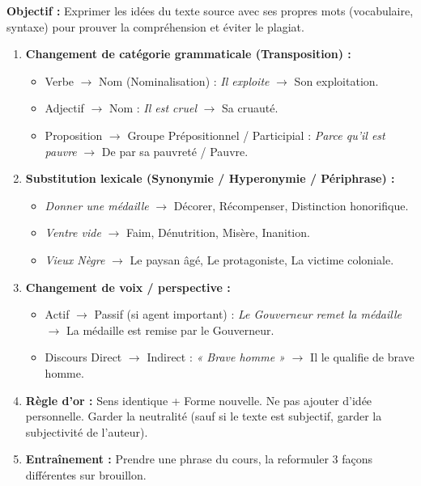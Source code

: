 \documentclass[11pt]{article}
\newcommand{\cle}[1]{{\popxbold\color{popdark}#1}}
\begin{document}
\begin{methode}
    \textbf{Objectif :} Exprimer les idées du texte source avec ses propres mots (vocabulaire, syntaxe) pour prouver la compréhension et éviter le plagiat.
    \begin{enumerate}
        \item \textbf{Changement de catégorie grammaticale (Transposition) :}
            \begin{itemize}
                \item Verbe $\rightarrow$ Nom (Nominalisation) : \textit{Il exploite} $\rightarrow$ \cle{Son exploitation}.
                \item Adjectif $\rightarrow$ Nom : \textit{Il est cruel} $\rightarrow$ \cle{Sa cruauté}.
                \item Proposition $\rightarrow$ Groupe Prépositionnel / Participial : \textit{Parce qu'il est pauvre} $\rightarrow$ \cle{De par sa pauvreté} / \cle{Pauvre}.
            \end{itemize}
        \item \textbf{Substitution lexicale (Synonymie / Hyperonymie / Périphrase) :}
            \begin{itemize}
                \item \textit{Donner une médaille} $\rightarrow$ \cle{Décorer}, \cle{Récompenser}, \cle{Distinction honorifique}.
                \item \textit{Ventre vide} $\rightarrow$ \cle{Faim}, \cle{Dénutrition}, \cle{Misère}, \cle{Inanition}.
                \item \textit{Vieux Nègre} $\rightarrow$ \cle{Le paysan âgé}, \cle{Le protagoniste}, \cle{La victime coloniale}.
            \end{itemize}
        \item \textbf{Changement de voix / perspective :}
            \begin{itemize}
                \item Actif $\rightarrow$ Passif (si agent important) : \textit{Le Gouverneur remet la médaille} $\rightarrow$ \cle{La médaille est remise par le Gouverneur}.
                \item Discours Direct $\rightarrow$ Indirect : \textit{« Brave homme »} $\rightarrow$ \cle{Il le qualifie de brave homme}.
            \end{itemize}
        \item \textbf{Règle d'or :} \cle{Sens identique + Forme nouvelle}. Ne pas ajouter d'idée personnelle. Garder la neutralité (sauf si le texte est subjectif, garder la subjectivité de l'auteur).
        \item \textbf{Entraînement :} Prendre une phrase du cours, la reformuler 3 façons différentes sur brouillon.
    \end{enumerate}
\end{methode}
\end{document}
